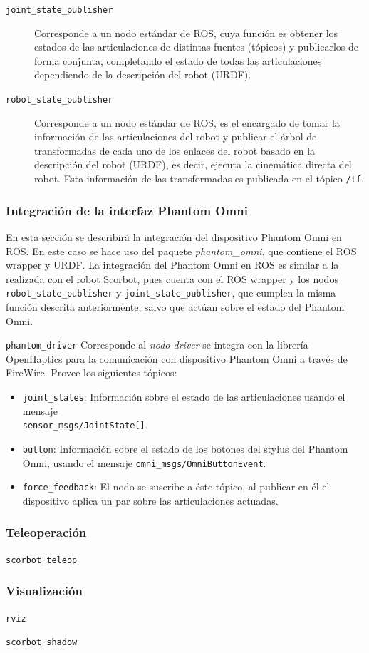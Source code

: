 \begin{description}
\item[\texttt{joint\_state\_publisher}] Corresponde a un nodo estándar de ROS, cuya función es obtener los estados de las articulaciones de distintas fuentes (tópicos) y publicarlos de forma conjunta, completando el estado de todas las articulaciones dependiendo de la descripción del robot (URDF).

\item[\texttt{robot\_state\_publisher}] Corresponde a un nodo estándar de ROS, es el encargado de tomar la información de las articulaciones del robot y publicar el árbol de transformadas de cada uno de los enlaces del robot basado en la descripción del robot (URDF), es decir, ejecuta la cinemática directa del robot. Esta información de las transformadas es publicada en el tópico \texttt{/tf}.

\end{description}


\subsubsection{Integración de la interfaz Phantom Omni}

En esta sección se describirá la integración del dispositivo Phantom Omni en ROS. En este caso se hace uso del paquete \textit{phantom\_omni}, que contiene el ROS wrapper y URDF. La integración del Phantom Omni en ROS es similar a la realizada con el robot Scorbot, pues cuenta con el  ROS wrapper y los nodos \texttt{robot\_state\_publisher} y  \texttt{joint\_state\_publisher}, que cumplen la misma función descrita anteriormente, salvo que actúan sobre el estado del Phantom Omni.

\texttt{phantom\_driver} Corresponde al \textit{nodo driver} se integra con la librería OpenHaptics para la comunicación con dispositivo Phantom Omni a través de FireWire. Provee los siguientes tópicos:

\begin{itemize}
\item \texttt{joint\_states}: Información sobre el estado de las articulaciones usando el mensaje \\ \texttt{sensor\_msgs/JointState[]}.

\item \texttt{button}: Información sobre el estado de los botones del stylus del Phantom Omni, usando el mensaje \texttt{omni\_msgs/OmniButtonEvent}.

\item \texttt{force\_feedback}: El nodo se suscribe a éste tópico, al publicar en él el dispositivo aplica un par sobre las articulaciones actuadas.
\end{itemize}


\subsubsection{Teleoperación}

\texttt{scorbot\_teleop}

\subsubsection{Visualización}

\texttt{rviz}

\texttt{scorbot\_shadow}
